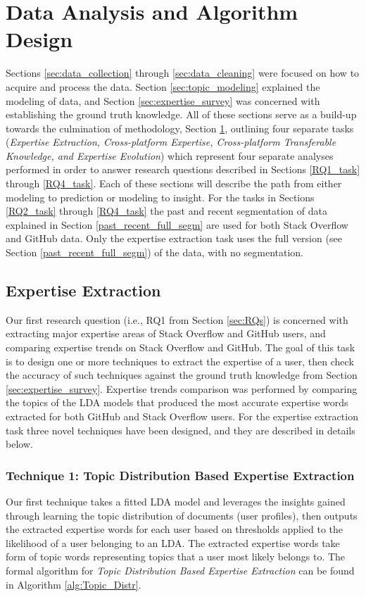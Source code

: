 \section{Data Analysis and Algorithm Design} \label{sec:algo_design}

    Sections \ref{sec:data_collection} through \ref{sec:data_cleaning} were focused on how to acquire and process the data. Section \ref{sec:topic_modeling} explained the modeling of data, and Section \ref{sec:expertise_survey} was concerned with establishing the ground truth knowledge. All of these sections serve as a build-up towards the culmination of methodology, Section \ref{sec:algo_design}, outlining four separate tasks (\emph{Expertise Extraction, Cross-platform Expertise, Cross-platform Transferable Knowledge, and Expertise Evolution}) which represent four separate analyses performed in order to answer research questions described in Sections \ref{RQ1_task} through \ref{RQ4_task}. Each of these sections will describe the path from either modeling to prediction or modeling to insight. For the tasks in Sections \ref{RQ2_task} through \ref{RQ4_task} the past and recent segmentation of data explained in Section \ref{past_recent_full_segm} are used for both Stack Overflow and GitHub data. Only the expertise extraction task uses the full version (see Section \ref{past_recent_full_segm}) of the data, with no segmentation. 
    
    \subsection{Expertise Extraction\label{RQ1_task}}
        Our first research question (i.e., RQ1 from Section \ref{sec:RQs}) is concerned with extracting major expertise areas of Stack Overflow and GitHub users, and comparing expertise trends on Stack Overflow and GitHub. The goal of this task is to design one or more techniques to extract the expertise of a user, then check the accuracy of such techniques against the ground truth knowledge from Section \ref{sec:expertise_survey}. Expertise trends comparison was performed by comparing the topics of the LDA models that produced the most accurate expertise words extracted for both GitHub and Stack Overflow users. For the expertise extraction task three novel techniques have been designed, and they are described in details below. 
        
        \subsubsection{Technique 1: Topic Distribution Based Expertise Extraction}
            Our first technique takes a fitted LDA model and leverages the insights gained through learning the topic distribution of documents (user profiles), then outputs the extracted expertise words for each user based on thresholds applied to the likelihood of a user belonging to an LDA. The extracted expertise words take form of topic words representing topics that a user most likely belongs to. The formal algorithm for \emph{Topic Distribution Based Expertise Extraction} can be found in Algorithm \ref{alg:Topic_Distr}.
            
